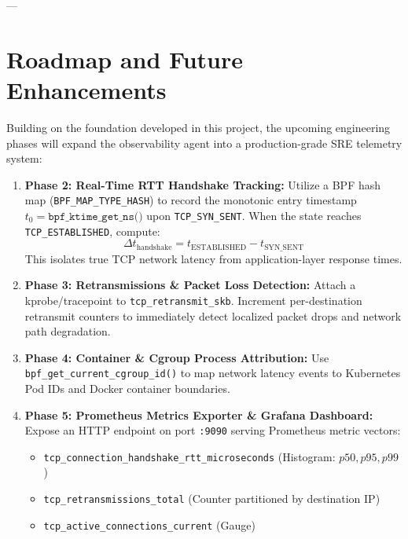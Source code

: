 \documentclass[11pt,a4paper]{article}
\begin{document}
---

\section{Roadmap and Future Enhancements}

Building on the foundation developed in this project, the upcoming engineering phases will expand the observability agent into a production-grade SRE telemetry system:

\begin{enumerate}
    \item \textbf{Phase 2: Real-Time RTT Handshake Tracking:}
    Utilize a BPF hash map (\texttt{BPF\_MAP\_TYPE\_HASH}) to record the monotonic entry timestamp $t_0 = \texttt{bpf\_ktime\_get\_ns()}$ upon \texttt{TCP\_SYN\_SENT}. When the state reaches \texttt{TCP\_ESTABLISHED}, compute:
    \begin{equation}
        \Delta t_{\text{handshake}} = t_{\text{ESTABLISHED}} - t_{\text{SYN\_SENT}}
    \end{equation}
    This isolates true TCP network latency from application-layer response times.

    \item \textbf{Phase 3: Retransmissions \& Packet Loss Detection:}
    Attach a kprobe/tracepoint to \texttt{tcp\_retransmit\_skb}. Increment per-destination retransmit counters to immediately detect localized packet drops and network path degradation.

    \item \textbf{Phase 4: Container \& Cgroup Process Attribution:}
    Use \texttt{bpf\_get\_current\_cgroup\_id()} to map network latency events to Kubernetes Pod IDs and Docker container boundaries.

    \item \textbf{Phase 5: Prometheus Metrics Exporter \& Grafana Dashboard:}
    Expose an HTTP endpoint on port \texttt{:9090} serving Prometheus metric vectors:
    \begin{itemize}
        \item \texttt{tcp\_connection\_handshake\_rtt\_microseconds} (Histogram: $p50, p95, p99$)
        \item \texttt{tcp\_retransmissions\_total} (Counter partitioned by destination IP)
        \item \texttt{tcp\_active\_connections\_current} (Gauge)
    \end{itemize}
\end{enumerate}
\end{document}
